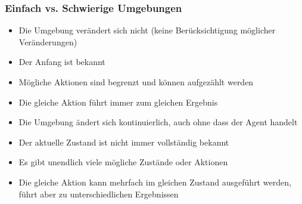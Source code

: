 \subsubsection*{Einfach vs. Schwierige Umgebungen}
\begin{minipage}{0.5\textwidth}
    \begin{defBox}[title=Szenario 1:]
        \begin{itemize}
            \item Die Umgebung verändert sich nicht (keine Berücksichtigung möglicher Veränderungen)
        \end{itemize}
        \begin{itemize}
            \item Der Anfang ist bekannt
        \end{itemize}
        \begin{itemize}
            \item Mögliche Aktionen sind begrenzt und können aufgezählt werden
        \end{itemize}
        \begin{itemize}
            \item Die gleiche Aktion führt immer zum gleichen Ergebnis
        \end{itemize}
    \end{defBox}
\end{minipage}
\begin{minipage}{0.5\textwidth}
    \begin{defBox}[title=Szenario 2:]
        \begin{itemize}
            \item Die Umgebung ändert sich kontinuierlich, auch ohne dass der Agent handelt
        \end{itemize}
        \begin{itemize}
            \item Der aktuelle Zustand ist nicht immer vollständig bekannt
        \end{itemize}
        \begin{itemize}
            \item Es gibt unendlich viele mögliche Zustände oder Aktionen
        \end{itemize}
        \begin{itemize}
            \item Die gleiche Aktion kann mehrfach im gleichen Zustand ausgeführt werden, führt aber zu unterschiedlichen Ergebnissen
        \end{itemize}
    \end{defBox}
\end{minipage}
